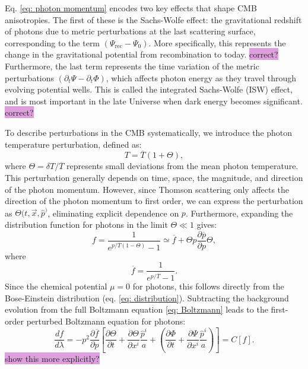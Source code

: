 \documentclass{aa}
\numberwithin{equation}{section}
\numberwithin{table}{section}
\numberwithin{figure}{section}
\begin{document}
Eq. \eqref{eq: photon momentum} encodes two key effects that shape CMB anisotropies. The first of these is the Sachs-Wolfe effect: the gravitational redshift of photons due to metric perturbations at the last scattering surface, corresponding to the term $(\Psi_{\text{rec}} - \Psi_0)$. More specifically, this represents the change in the gravitational potential from recombination to today. \colorbox{Plum}{correct?} Furthermore, the last term represents the time variation of the metric perturbations $(\partial_t \Psi - \partial_t \Phi)$, which affects photon energy as they travel through evolving potential wells. This is called the integrated Sachs-Wolfe (ISW) effect, and is most important in the late Universe when dark energy becomes significant. \colorbox{Plum}{correct?}


To describe perturbations in the CMB systematically, we introduce the photon temperature perturbation, defined as:
\begin{equation}
T = \overline{T} (1 + \Theta),
\end{equation}
where $\Theta = \delta T/\overline{T}$ represents small deviations from the mean photon temperature. This perturbation generally depends on time, space, the magnitude, and direction of the photon momentum. However, since Thomson scattering only affects the direction of the photon momentum to first order, we can express the perturbation as $\Theta(t, \vec{x}, \hat{p}^)$, eliminating explicit dependence on $p$. Furthermore, expanding the distribution function for photons in the limit $\Theta \ll 1$ gives:
\begin{equation}
f = \frac{1}{e^{p/\overline{T}(1-\Theta)}-1} \simeq \overline{f} + \Theta p\frac{\partial\overline{p}}{\partial p} \Theta,
\end{equation}
where 
\begin{equation}
  \overline{f} = \frac{1}{e^{p/\overline{T}}-1}.
\end{equation}
Since the chemical potential $\mu=0$ for photons, this follows directly from the Bose-Einstein distribution (eq. \eqref{eq: distribution}). Subtracting the background evolution from the full Boltzmann equation \eqref{eq: Boltzmann} leads to the first-order perturbed Boltzmann equation for photons:
\begin{equation}
\frac{df}{d\lambda} = -p^2\frac{\partial\overline{f}}{\partial p}\left[\frac{\partial{\Theta}}{\partial t} + \frac{\partial{\Theta}}{\partial x^{i}}\frac{\hat{p}^{i}}{a} + \left(\frac{\partial{\Phi}}{\partial t} + \frac{\partial{\Psi}}{\partial x^{i}}\frac{\hat{p}^{i}}{a} \right) \right] = C[f]. \label{eq: Boltzmann photons}
\end{equation}
\colorbox{Plum}{show this more explicitly?} 
\end{document}
